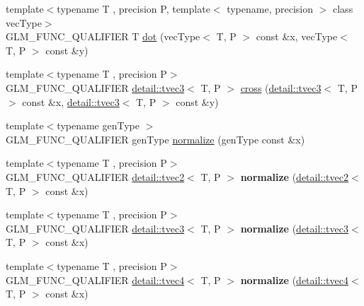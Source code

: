 \begin{DoxyCompactItemize}
\item 
{\footnotesize template$<$typename T , precision P, template$<$ typename, precision $>$ class vec\+Type$>$ }\\G\+L\+M\+\_\+\+F\+U\+N\+C\+\_\+\+Q\+U\+A\+L\+I\+F\+I\+ER T \hyperlink{group__core__func__geometric_ga7dada304da2ba7dd3376ab4f178c3f6b}{dot} (vec\+Type$<$ T, P $>$ const \&x, vec\+Type$<$ T, P $>$ const \&y)
\item 
{\footnotesize template$<$typename T , precision P$>$ }\\G\+L\+M\+\_\+\+F\+U\+N\+C\+\_\+\+Q\+U\+A\+L\+I\+F\+I\+ER \hyperlink{structglm_1_1detail_1_1tvec3}{detail\+::tvec3}$<$ T, P $>$ \hyperlink{group__core__func__geometric_ga89b91c2a256cfb62ecbc589d1ee36d3c}{cross} (\hyperlink{structglm_1_1detail_1_1tvec3}{detail\+::tvec3}$<$ T, P $>$ const \&x, \hyperlink{structglm_1_1detail_1_1tvec3}{detail\+::tvec3}$<$ T, P $>$ const \&y)
\item 
{\footnotesize template$<$typename gen\+Type $>$ }\\G\+L\+M\+\_\+\+F\+U\+N\+C\+\_\+\+Q\+U\+A\+L\+I\+F\+I\+ER gen\+Type \hyperlink{group__core__func__geometric_ga15aa87101457e41663b08a8dcc3357f8}{normalize} (gen\+Type const \&x)
\item 
{\footnotesize template$<$typename T , precision P$>$ }\\G\+L\+M\+\_\+\+F\+U\+N\+C\+\_\+\+Q\+U\+A\+L\+I\+F\+I\+ER \hyperlink{structglm_1_1detail_1_1tvec2}{detail\+::tvec2}$<$ T, P $>$ {\bfseries normalize} (\hyperlink{structglm_1_1detail_1_1tvec2}{detail\+::tvec2}$<$ T, P $>$ const \&x)\hypertarget{namespaceglm_a3cdf867b5e7051372a7d4ba81fbf830c}{}\label{namespaceglm_a3cdf867b5e7051372a7d4ba81fbf830c}

\item 
{\footnotesize template$<$typename T , precision P$>$ }\\G\+L\+M\+\_\+\+F\+U\+N\+C\+\_\+\+Q\+U\+A\+L\+I\+F\+I\+ER \hyperlink{structglm_1_1detail_1_1tvec3}{detail\+::tvec3}$<$ T, P $>$ {\bfseries normalize} (\hyperlink{structglm_1_1detail_1_1tvec3}{detail\+::tvec3}$<$ T, P $>$ const \&x)\hypertarget{namespaceglm_af238550c4974c61571d5021d1b5f94fe}{}\label{namespaceglm_af238550c4974c61571d5021d1b5f94fe}

\item 
{\footnotesize template$<$typename T , precision P$>$ }\\G\+L\+M\+\_\+\+F\+U\+N\+C\+\_\+\+Q\+U\+A\+L\+I\+F\+I\+ER \hyperlink{structglm_1_1detail_1_1tvec4}{detail\+::tvec4}$<$ T, P $>$ {\bfseries normalize} (\hyperlink{structglm_1_1detail_1_1tvec4}{detail\+::tvec4}$<$ T, P $>$ const \&x)\hypertarget{namespaceglm_a7ef6210f95347aa9bf898b789821dcdf}{}\label{namespaceglm_a7ef6210f95347aa9bf898b789821dcdf}


\end{DoxyCompactItemize}
